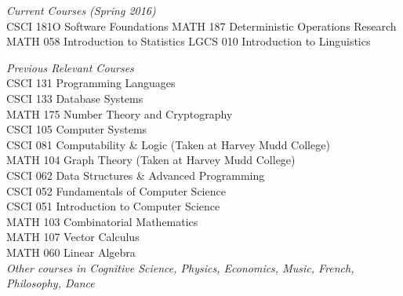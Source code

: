 {\sl Current Courses (Spring 2016)} \\
CSCI 181O Software Foundations
MATH 187 Deterministic Operations Research
MATH 058 Introduction to Statistics
LGCS 010 Introduction to Linguistics

{\sl Previous Relevant Courses} \\
CSCI 131 Programming Languages \\
CSCI 133 Database Systems \\
MATH 175 Number Theory and Cryptography \\
CSCI 105 Computer Systems\\
CSCI 081 Computability \& Logic (Taken at Harvey Mudd College)\\
MATH 104 Graph Theory (Taken at Harvey Mudd College)\\
CSCI 062 Data Structures \& Advanced Programming \\
CSCI 052 Fundamentals of Computer Science \\
CSCI 051 Introduction to Computer Science \\
MATH 103 Combinatorial Mathematics \\
MATH 107 Vector Calculus \\
MATH 060 Linear Algebra  \\
\textit{Other courses in Cognitive Science, Physics, Economics, Music, French, Philosophy, Dance}
